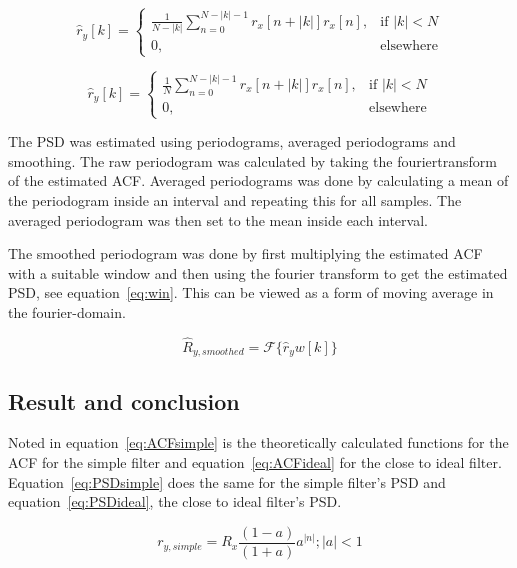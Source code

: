 \documentclass[10pt]{article}
\begin{document}
\begin{equation}
\label{eq:BmanT}
\hat{r}_y[k] =
\begin{cases}
    \frac{1}{N-|k|}\sum_{n=0}^{N-|k|-1}r_x[n+|k|]r_x[n],& \text{if } |k|< N\\
    0,              & \text{elsewhere}
\end{cases}
\end{equation}


\begin{equation}
\label{eq:Blett}
\hat{r}_y[k] =
\begin{cases}
    \frac{1}{N}\sum_{n=0}^{N-|k|-1}r_x[n+|k|]r_x[n],& \text{if } |k|< N\\
    0,              & \text{elsewhere}
\end{cases}
\end{equation}

The PSD was estimated using periodograms, averaged periodograms
and smoothing. The raw periodogram was calculated by taking the fouriertransform
of the estimated ACF.
Averaged periodograms was done by calculating a mean of the periodogram inside
an interval and repeating this for all samples. The averaged periodogram was
then set to the mean inside each interval.

The smoothed periodogram was done by first multiplying the estimated ACF with a
 suitable window and then using the fourier transform to get the estimated PSD,
 see equation~\ref{eq:win}. This can be viewed as a form of moving average in the fourier-domain.

 \begin{equation}
 \label{eq:win}
 \hat{R}_{y,smoothed} = \mathcal{F}\{\hat{r}_yw[k]\}
 \end{equation}



\subsection{Result and conclusion}

Noted in equation~\ref{eq:ACFsimple} is the theoretically calculated functions
for the ACF for the simple filter and equation~\ref{eq:ACFideal} for the close
to ideal filter.
Equation~\ref{eq:PSDsimple} does the same for the simple filter's PSD
and equation~\ref{eq:PSDideal}, the close to ideal filter's PSD.

\begin{equation}
  \label{eq:ACFsimple}
  r_{y,simple} = R_x\frac{(1-a)}{(1+a)}a^{|n|};  |a| < 1
\end{equation}
\end{document}
